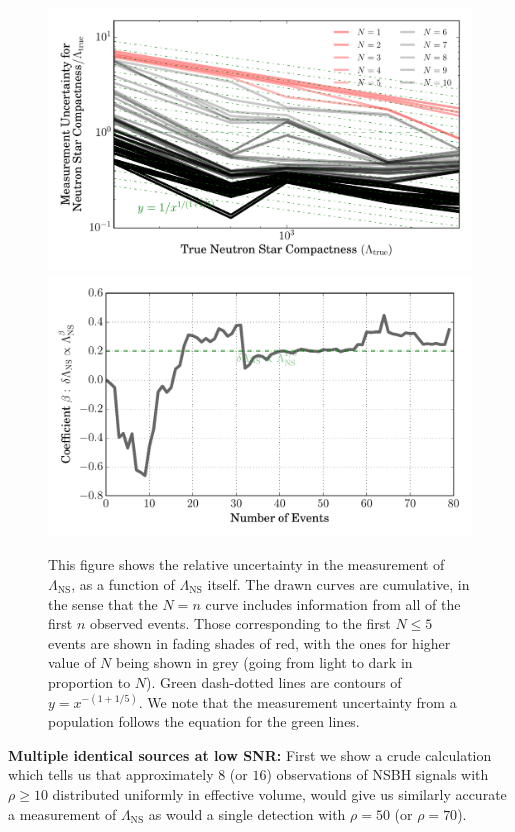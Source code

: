 \documentclass[aps,prd,amsmath,floats,floatfix, twocolumn,
superscriptaddress,nofootinbib,showpacs]{revtex4-1}
\newcommand{\prayush}{\textcolor{red!40!black}}
\newcommand{\lambdans}{\Lambda_\mathrm{NS}}
\begin{document}
% 
\begin{figure}
\centering    
\includegraphics[width=\columnwidth]{plots/LambdalErrorBars_vs_Lambda_N79_Log.pdf}
\includegraphics[width=\columnwidth]{plots/PowerLawCoefficient_LambdaErrorvsLambda_vs_N.pdf}
\caption{This figure shows the relative uncertainty in the measurement of $\lambdans$,
as a function of $\lambdans$ itself. The drawn curves are cumulative, in the sense 
that the $N=n$ curve includes information from all of the first $n$ observed events.
Those corresponding to the first $N\leq 5$ events are shown in fading shades of red,
with the ones for higher value of $N$ being shown in grey (going from light to dark in
proportion to $N$).
Green dash-dotted lines are contours of $y=x^{-(1+1/5)}$.
% 
\prayush{We note that the measurement uncertainty from a population follows the
equation for the green lines.}
% 
}
\label{fig:TT_Lambda_vs_Lambda_L500_2000_CI90_0_AllInOne}
\end{figure}
%
% 
\textbf{Multiple identical sources at low SNR: }\label{s2:identical_multiple}
% 
% 
First we show a crude calculation which tells us that approximately $8$ (or $16$) 
observations
of NSBH signals with $\rho\geq 10$ distributed uniformly in effective volume, would
give us similarly accurate a measurement of $\lambdans$ as would a single detection
with $\rho=50$ (or $\rho=70$). 
\end{document}
